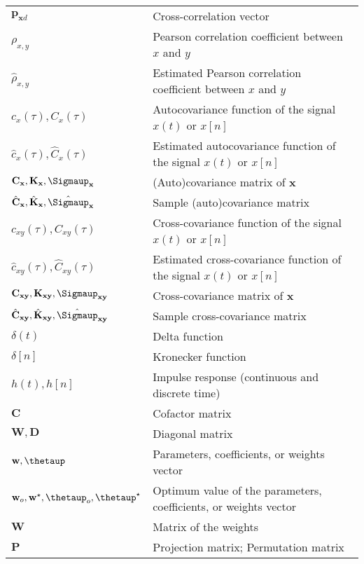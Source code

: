 \documentclass{article}
\begin{document}
\begin{xltabular}{\textwidth}{XX}
    \(\mathbf{p}_{\mathbf{x}d}\)& Cross-correlation vector\\
    \(\rho_{x,y}\) & Pearson correlation coefficient between \(x\) and \(y\)\\
    \(\hat{\rho}_{x,y}\) & Estimated Pearson correlation coefficient between \(x\) and \(y\)\\
    \(c_x(\tau), C_x(\tau)\) & Autocovariance function of the signal \(x(t)\) or \(x[n]\)\\
    \(\hat{c}_x(\tau), \hat{C}_x(\tau)\) & Estimated autocovariance function of the signal \(x(t)\) or \(x[n]\)\\
    \(\mathbf{C}_\mathbf{x}, \mathbf{K}_\mathbf{x}, \boldsymbol{\Sigmaup}_\mathbf{x}\) & (Auto)covariance matrix of \(\mathbf{x}\) \\
    \(\hat{\mathbf{C}}_\mathbf{x}, \hat{\mathbf{K}}_\mathbf{x}, \hat{\boldsymbol{\Sigmaup}}_\mathbf{x}\) & Sample (auto)covariance matrix \\
    \(c_{xy}(\tau), C_{xy}(\tau)\) & Cross-covariance function of the signal \(x(t)\) or \(x[n]\)\\
    \(\hat{c}_{xy}(\tau), \hat{C}_{xy}(\tau)\) & Estimated cross-covariance function of the signal \(x(t)\) or \(x[n]\)\\
    \(\mathbf{C}_{\mathbf{xy}}, \mathbf{K}_{\mathbf{xy}}, \boldsymbol{\Sigmaup}_{\mathbf{xy}}\) & Cross-covariance matrix of \(\mathbf{x}\) \\
    \(\hat{\mathbf{C}}_{\mathbf{xy}}, \hat{\mathbf{K}}_{\mathbf{xy}}, \hat{\boldsymbol{\Sigmaup}}_{\mathbf{xy}}\) & Sample cross-covariance matrix \\
    \(\delta(t)\) & Delta function\\
    \(\delta[n]\) & Kronecker function\\
    \(h(t), h[n]\) & Impulse response (continuous and discrete time)\\
    \(\mathbf{C}\) & Cofactor matrix\\
    \(\mathbf{W}, \mathbf{D}\) & Diagonal matrix \\
    \(\mathbf{w}, \boldsymbol{\thetaup}\) & Parameters, coefficients, or weights vector \\
    \(\mathbf{w}_o, \mathbf{w}^{\star}, \boldsymbol{\thetaup}_o, \boldsymbol{\thetaup}^{\star}\) & Optimum value of the parameters, coefficients, or weights vector \\
    \(\mathbf{W}\) & Matrix of the weights \\
    \(\mathbf{P}\) & Projection matrix; Permutation matrix \\

\end{xltabular}
\end{document}
